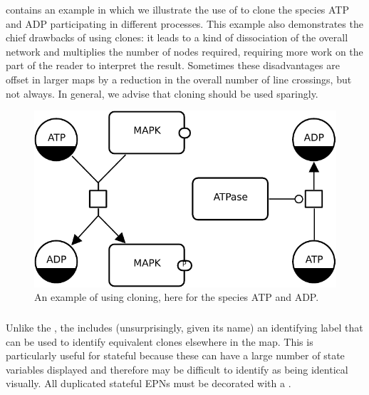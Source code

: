  contains an example in which we illustrate the use of  to clone the species ATP and ADP participating in different processes.  This example also demonstrates the chief drawbacks of using clones: it leads to a kind of dissociation of the overall network and multiplies the number of nodes required, requiring more work on the part of the reader to interpret the result.  Sometimes these disadvantages are offset in larger maps by a reduction in the overall number of line crossings, but not always.  In general, we advise that cloning should be used sparingly.

\begin{figure}[H]
  \centering
  \includegraphics[scale = 0.8]{images/build/cloning_example.pdf}
  \caption{An example of using cloning, here for the species ATP and ADP.}
  \label{fig:example-cloning}
\end{figure}

\subsubsection{}

Unlike the , the  includes (unsurprisingly, given its name) an identifying label that can be used to identify equivalent clones elsewhere in the map.
This is particularly useful for stateful  because these can have a large number of state variables displayed and therefore may be difficult to identify as being identical visually.
All duplicated stateful EPNs must be decorated with a .

